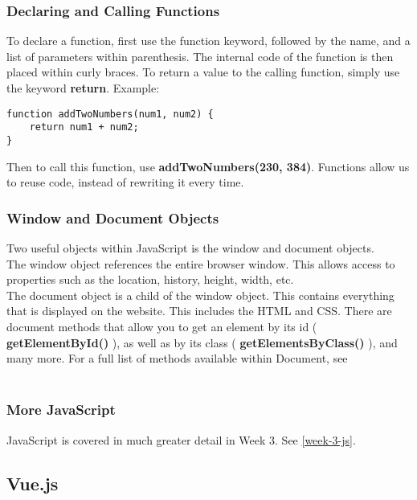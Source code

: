 \documentclass[12pt]{report}
\begin{document}
				\subsubsection{Declaring and Calling Functions}
					To declare a function, first use the function keyword, followed by the name, and a list of parameters within parenthesis. The internal code of the function is then placed within curly braces. To return a value to the calling function, simply use the keyword \textbf{return}. Example:\\

					\begin{lstlisting}
function addTwoNumbers(num1, num2) {
	return num1 + num2;
}
					\end{lstlisting}
					\vspace{0.5cm}

					Then to call this function, use \textbf{addTwoNumbers(230, 384)}. Functions allow us to reuse code, instead of rewriting it every time.

				\subsubsection{Window and Document Objects}
					Two useful objects within JavaScript is the window and document objects. \\

					The window object references the entire browser window. This allows access to properties such as  the location, history, height, width, etc. \\

					The document object is a child of the window object. This contains everything that is displayed on the website. This includes the HTML and CSS. There are document methods that allow you to get an element by its id ( \textbf{getElementById()} ), as well as by its class ( \textbf{ getElementsByClass()}  ), and many more. For a full list of methods available within Document, see \\ \\


				\subsubsection{More JavaScript}
					JavaScript is covered in much greater detail in Week 3. See \ref{week-3-js}.\\

			\subsection{Vue.js}
\end{document}
